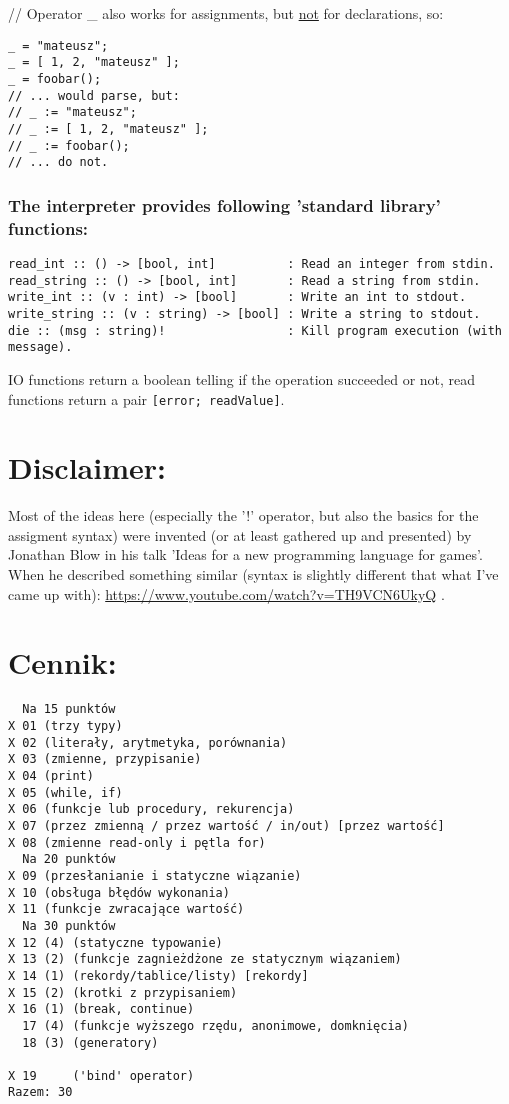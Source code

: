 \documentclass[11pt]{article}
\begin{document}
// Operator \_ also works for assignments, but \uline{not} for declarations, so:
\begin{verbatim}
_ = "mateusz";
_ = [ 1, 2, "mateusz" ];
_ = foobar();
// ... would parse, but:
// _ := "mateusz";
// _ := [ 1, 2, "mateusz" ];
// _ := foobar();
// ... do not.
\end{verbatim}

\subsubsection*{The interpreter provides following 'standard library' functions:}
\label{sec:org169691f}
\begin{verbatim}
read_int :: () -> [bool, int]          : Read an integer from stdin.
read_string :: () -> [bool, int]       : Read a string from stdin.
write_int :: (v : int) -> [bool]       : Write an int to stdout.
write_string :: (v : string) -> [bool] : Write a string to stdout.
die :: (msg : string)!                 : Kill program execution (with message).
\end{verbatim}

IO functions return a boolean telling if the operation succeeded or not, read
functions return a pair \texttt{[error; readValue]}.

\section*{Disclaimer:}
\label{sec:org61a5b55}

Most of the ideas here (especially the '!' operator, but also the basics for the
assigment syntax) were invented (or at least gathered up and presented) by
Jonathan Blow in his talk 'Ideas for a new programming language for games'. When
he described something similar (syntax is slightly different that what I've came
up with): \url{https://www.youtube.com/watch?v=TH9VCN6UkyQ} .

\section*{Cennik:}
\label{sec:orgb8f3150}
\begin{verbatim}
  Na 15 punktów
X 01 (trzy typy)
X 02 (literały, arytmetyka, porównania)
X 03 (zmienne, przypisanie)
X 04 (print)
X 05 (while, if)
X 06 (funkcje lub procedury, rekurencja)
X 07 (przez zmienną / przez wartość / in/out) [przez wartość]
X 08 (zmienne read-only i pętla for)
  Na 20 punktów
X 09 (przesłanianie i statyczne wiązanie)
X 10 (obsługa błędów wykonania)
X 11 (funkcje zwracające wartość)
  Na 30 punktów
X 12 (4) (statyczne typowanie)
X 13 (2) (funkcje zagnieżdżone ze statycznym wiązaniem)
X 14 (1) (rekordy/tablice/listy) [rekordy]
X 15 (2) (krotki z przypisaniem)
X 16 (1) (break, continue)
  17 (4) (funkcje wyższego rzędu, anonimowe, domknięcia)
  18 (3) (generatory)

X 19     ('bind' operator)
Razem: 30
\end{verbatim}
\end{document}

